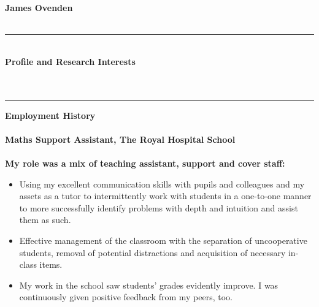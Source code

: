 \documentclass[9pt]{article}
\begin{document}
\begin{center}
\bfseries{James Ovenden}\\
\\
\end{center}
\rule[0.1cm]{\textwidth}{0.05cm}\\
\bfseries{Profile and Research Interests}\\
\vspace{0cm}\\
\\
\rule[0.1cm]{\textwidth}{0.04cm}
\bfseries{Employment History}\\
\vspace{0.1cm}\\
 \hspace{77pt} \bfseries{Maths Support Assistant, The Royal Hospital School} \hspace{55pt} \\
\vspace{0cm}\\
My role was a mix of teaching assistant, support and cover staff:
\begin{itemize}[itemsep=0mm, parsep=0pt]
\item Using my excellent communication skills with pupils and colleagues and my assets as a tutor to intermittently work with students in a one-to-one manner to more successfully identify problems with depth and intuition and assist them as such.
\item Effective management of the classroom with the separation of uncooperative students, removal of potential distractions and acquisition of necessary in-class items.
\item My work in the school saw students' grades evidently improve. I was continuously given positive feedback from my peers, too.
\end{itemize}
\end{document}
